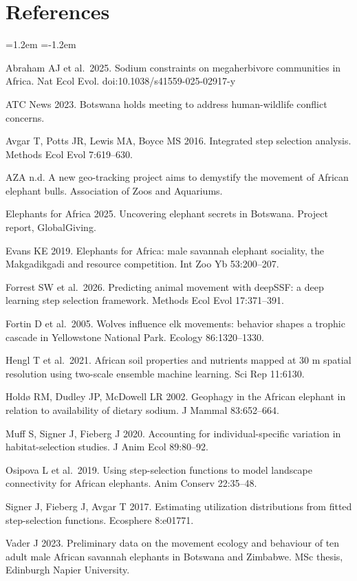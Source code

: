 \documentclass[11pt,a4paper]{article}
\begin{document}
\section{References}
\begin{list}{}{\leftmargin=1.2em \itemindent=-1.2em \itemsep=0pt \parsep=0pt \topsep=0pt}
\item Abraham AJ et al.\ 2025. Sodium constraints on megaherbivore communities in Africa. Nat Ecol Evol. doi:10.1038/s41559-025-02917-y
\item ATC News 2023. Botswana holds meeting to address human-wildlife conflict concerns.
\item Avgar T, Potts JR, Lewis MA, Boyce MS 2016. Integrated step selection analysis. Methods Ecol Evol 7:619--630.
\item AZA n.d. A new geo-tracking project aims to demystify the movement of African elephant bulls. Association of Zoos and Aquariums.
\item Elephants for Africa 2025. Uncovering elephant secrets in Botswana. Project report, GlobalGiving.
\item Evans KE 2019. Elephants for Africa: male savannah elephant sociality, the Makgadikgadi and resource competition. Int Zoo Yb 53:200--207.
\item Forrest SW et al.\ 2026. Predicting animal movement with deepSSF: a deep learning step selection framework. Methods Ecol Evol 17:371--391.
\item Fortin D et al.\ 2005. Wolves influence elk movements: behavior shapes a trophic cascade in Yellowstone National Park. Ecology 86:1320--1330.
\item Hengl T et al.\ 2021. African soil properties and nutrients mapped at 30 m spatial resolution using two-scale ensemble machine learning. Sci Rep 11:6130.
\item Holdø RM, Dudley JP, McDowell LR 2002. Geophagy in the African elephant in relation to availability of dietary sodium. J Mammal 83:652--664.
\item Muff S, Signer J, Fieberg J 2020. Accounting for individual-specific variation in habitat-selection studies. J Anim Ecol 89:80--92.
\item Osipova L et al.\ 2019. Using step-selection functions to model landscape connectivity for African elephants. Anim Conserv 22:35--48.
\item Signer J, Fieberg J, Avgar T 2017. Estimating utilization distributions from fitted step-selection functions. Ecosphere 8:e01771.
\item Vader J 2023. Preliminary data on the movement ecology and behaviour of ten adult male African savannah elephants in Botswana and Zimbabwe. MSc thesis, Edinburgh Napier University.
\end{list}
\end{document}
